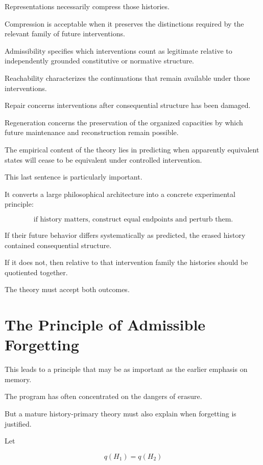 \documentclass[11pt]{article}
\theoremstyle{remark}
\begin{document}
Representations necessarily compress those histories.

Compression is acceptable when it preserves the distinctions required by the relevant family of future interventions.

Admissibility specifies which interventions count as legitimate relative to independently grounded constitutive or normative structure.

Reachability characterizes the continuations that remain available under those interventions.

Repair concerns interventions after consequential structure has been damaged.

Regeneration concerns the preservation of the organized capacities by which future maintenance and reconstruction remain possible.

The empirical content of the theory lies in predicting when apparently equivalent states will cease to be equivalent under controlled intervention.

This last sentence is particularly important.

It converts a large philosophical architecture into a concrete experimental principle:

\begin{equation}
\boxed{
\text{if history matters, construct equal endpoints and perturb them}.
}
\end{equation}

If their future behavior differs systematically as predicted, the erased history contained consequential structure.

If it does not, then relative to that intervention family the histories should be quotiented together.

The theory must accept both outcomes.

\section{The Principle of Admissible Forgetting}

This leads to a principle that may be as important as the earlier emphasis on memory.

The program has often concentrated on the dangers of erasure.

But a mature history-primary theory must also explain when forgetting is justified.

Let

\begin{equation}
q(H_1)=q(H_2)
\end{equation}
\end{document}
